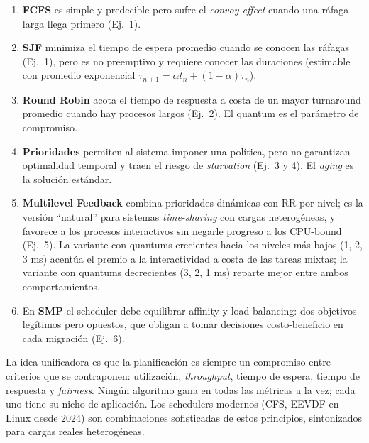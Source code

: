 \documentclass[11pt,a4paper]{article}
\begin{document}
\begin{enumerate}[leftmargin=*,nosep]
    \item \textbf{FCFS} es simple y predecible pero sufre el
        \emph{convoy effect} cuando una ráfaga larga llega primero
        (Ej.~1).
    \item \textbf{SJF} minimiza el tiempo de espera promedio cuando
        se conocen las ráfagas (Ej.~1), pero es no preemptivo y
        requiere conocer las duraciones (estimable con promedio
        exponencial $\tau_{n+1} = \alpha t_n + (1 - \alpha)\tau_n$).
    \item \textbf{Round Robin} acota el tiempo de respuesta a costa
        de un mayor turnaround promedio cuando hay procesos largos
        (Ej.~2). El quantum es el parámetro de compromiso.
    \item \textbf{Prioridades} permiten al sistema imponer una
        política, pero no garantizan optimalidad temporal y traen el
        riesgo de \emph{starvation} (Ej.~3 y 4). El \emph{aging} es
        la solución estándar.
    \item \textbf{Multilevel Feedback} combina prioridades dinámicas
        con RR por nivel; es la versión ``natural'' para sistemas
        \emph{time-sharing} con cargas heterogéneas, y favorece a los
        procesos interactivos sin negarle progreso a los CPU-bound
        (Ej.~5). La variante con quantums crecientes hacia los niveles
        más bajos (1, 2, 3 ms) acentúa el premio a la interactividad a
        costa de las tareas mixtas; la variante con quantums
        decrecientes (3, 2, 1 ms) reparte mejor entre ambos
        comportamientos.
    \item En \textbf{SMP} el scheduler debe equilibrar affinity y
        load balancing: dos objetivos legítimos pero opuestos, que
        obligan a tomar decisiones costo-beneficio en cada migración
        (Ej.~6).
\end{enumerate}

La idea unificadora es que la planificación es siempre un
compromiso entre criterios que se contraponen: utilización,
\emph{throughput}, tiempo de espera, tiempo de respuesta y
\emph{fairness}. Ningún algoritmo gana en todas las métricas a la
vez; cada uno tiene su nicho de aplicación. Los schedulers modernos
(CFS, EEVDF en Linux desde 2024) son combinaciones sofisticadas de
estos principios, sintonizados para cargas reales heterogéneas.
\end{document}
